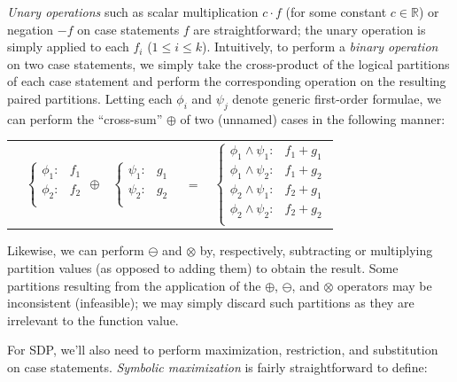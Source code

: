 \documentclass[letterpaper]{article}
\begin{document}
\emph{Unary operations} such as scalar multiplication $c\cdot f$ (for
some constant $c \in \mathbb{R}$) or negation $-f$ on case statements
$f$ are straightforward; the unary operation is simply applied to each
$f_i$ ($1 \leq i \leq k$). Intuitively, to perform a \emph{binary
  operation} on two case statements, we simply take the cross-product
of the logical partitions of each case statement and perform the
corresponding operation on the resulting paired partitions.  Letting
each $\phi_i$ and $\psi_j$ denote generic first-order formulae, we can
perform the ``cross-sum'' $\oplus$ of two (unnamed) cases in the
following manner:

{\footnotesize 
\begin{center}
\begin{tabular}{r c c c l}
&
\hspace{-6mm} 
  $\begin{cases}
    \phi_1: & f_1 \\ 
    \phi_2: & f_2 \\ 
  \end{cases}$
$\oplus$
&
\hspace{-4mm}
  $\begin{cases}
    \psi_1: & g_1 \\ 
    \psi_2: & g_2 \\ 
  \end{cases}$
&
\hspace{-2mm} 
$ = $
&
\hspace{-2mm}
  $\begin{cases}
  \phi_1 \wedge \psi_1: & f_1 + g_1 \\ 
  \phi_1 \wedge \psi_2: & f_1 + g_2 \\ 
  \phi_2 \wedge \psi_1: & f_2 + g_1 \\ 
  \phi_2 \wedge \psi_2: & f_2 + g_2 \\ 
  \end{cases}$
\end{tabular}
\end{center}
}
\normalsize

Likewise, we can perform $\ominus$ and $\otimes$ by,
respectively, subtracting or multiplying partition values (as opposed
to adding them) to obtain the result.  Some partitions resulting from
the application of the $\oplus$, $\ominus$, and $\otimes$ operators
may be inconsistent (infeasible); we may simply discard such 
partitions as they are irrelevant to the function value.

For SDP, we'll also need to perform maximization, restriction,
and substitution on case statements.  
\emph{Symbolic maximization} is fairly straightforward
to define:
\vspace{-5mm}
\end{document}
